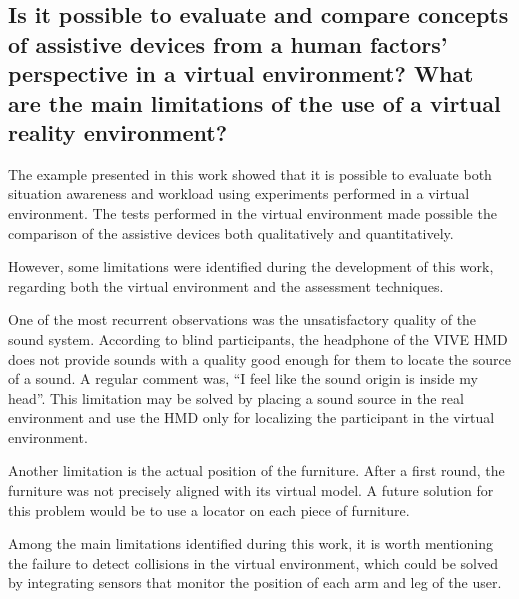 

\subsection*{Is it possible to evaluate and compare concepts of assistive devices from a human factors’ perspective in a virtual environment? What are the main limitations of the use of a virtual reality environment?
}

The example presented in this work showed that it is possible to evaluate both situation awareness and workload using experiments performed in a virtual environment. The tests performed in the virtual environment made possible the comparison of the assistive devices both qualitatively and quantitatively.

However, some limitations were identified during the development of this work, regarding both the virtual environment and the assessment techniques.

One of the most recurrent observations was the unsatisfactory quality of the sound system. According to blind participants, the headphone of the VIVE HMD does not provide sounds with a quality good enough for them to locate the source of a sound. A regular comment was, “I feel like the sound origin is inside my head”. This limitation may be solved by placing a sound source in the real environment and use the HMD only for localizing the participant in the virtual environment.

Another limitation is the actual position of the furniture. After a first round, the furniture was not precisely aligned with its virtual model. A future solution for this problem would be to use a locator on each piece of furniture.

Among the main limitations identified during this work, it is worth mentioning the failure to detect collisions in the virtual environment, which could be solved by integrating sensors that monitor the position of each arm and leg of the user.

